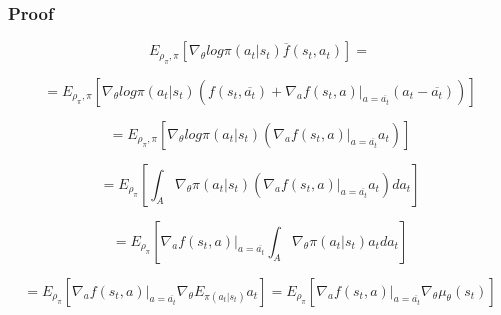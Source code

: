 \documentclass{beamer}
\begin{document}
\begin{frame}[t]
\frametitle{Proof}

\begin{equation}
 E_{\rho_\pi, \pi} \left[ \nabla_\theta log \pi(a_t | s_t) \overline{f} (s_t, a_t) \right] =
\end{equation}

\begin{equation}
= E_{\rho_\pi, \pi} \left[ \nabla_\theta log \pi(a_t | s_t) (f (s_t, \overline{a_t}) + 
\nabla_a f(s_t, a) |_{a=\overline{a_t}} (a_t - \overline{a_t})) \right]
\end{equation}

\begin{equation}
= E_{\rho_\pi, \pi} \left[ \nabla_\theta log \pi(a_t | s_t) ( 
\nabla_a f(s_t, a) |_{a=\overline{a_t}} a_t) \right]
\end{equation}

\begin{equation}
= E_{\rho_\pi} \left[ \int_{A} \nabla_\theta \pi(a_t | s_t) ( 
\nabla_a f(s_t, a) |_{a=\overline{a_t}} a_t) da_t \right]
\end{equation}

\begin{equation}
= E_{\rho_\pi} \left[ \nabla_a f(s_t, a) |_{a=\overline{a_t}} \int_{A} \nabla_\theta \pi(a_t | s_t) a_t da_t \right]
\end{equation}

\begin{equation}
= E_{\rho_\pi} \left[ \nabla_a f(s_t, a) |_{a=\overline{a_t}} \nabla_\theta E_{\pi(a_t | s_t)} a_t \right] = E_{\rho_\pi} \left[ \nabla_a f(s_t, a) |_{a=\overline{a_t}} \nabla_\theta \mu_\theta(s_t) \right]
\end{equation}

\end{frame}
\end{document}
